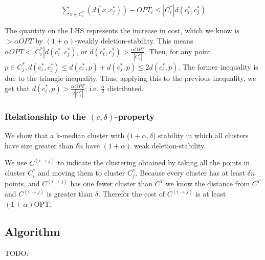 \documentclass[paper=a4, fontsize=11pt]{scrartcl} %
\numberwithin{equation}{section} %
\numberwithin{figure}{section} %
\numberwithin{table}{section} %
\begin{document}
\begin{align}
\sum_{x \in C^*_i} (d(x, c^*_j) )  - OPT_i \leq |C^*_i| d(c^*_i, c^*_j)
\end{align}

The quantity on the LHS represents the increase in cost, which we know is $ > \alpha OPT$ by $(1+\alpha)$-weakly deletion-stability. This means $\alpha OPT < |C^*_i| d(c^*_i, c^*_j)$, or $d(c^*_i, c^*_j) >\frac{\alpha OPT}{|C^*_i|}$.  Then, for any point $p \in C^*_j, d(c^*_i, c^*_j) \leq d(c^*_i, p) + d(c^*_j, p) \leq 2d(c^*_i, p)$. The former inequality is due to the triangle inequality.  Thus, applying this to the previous inequality, we get that $d(c^*_i, p) > \frac{\alpha OPT}{2 |C^*_i|}$; i.e. $\frac{\alpha}{2}$ distributed.

\subsubsection{Relationship to the $(c, \delta)$-property}

We show that a k-median cluster with ($1+\alpha, \delta$) stability in which all clusters have size greater than $\delta n$ have $(1+\alpha)$ weak deletion-stability.

We use $C^{(i\rightarrow j)}$ to indicate the clustering obtained by taking all the points in cluster $C_i^*$ and moving them to cluster $C_j^*$. Because every cluster has at least $\delta n$ points, and $C^{(i \rightarrow j)}$ has one fewer cluster than $C^T$ we know the distance from $C^T$ and $C^{(i\rightarrow j)}$ is greater than $\delta$. Therefor the cost of $C^{(i\rightarrow j)}$ is at least $(1 + \alpha)\text{OPT}$.

\subsection{Algorithm}
TODO:
\end{document}
